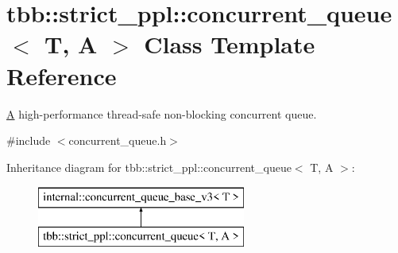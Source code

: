 \hypertarget{classtbb_1_1strict__ppl_1_1concurrent__queue}{}\section{tbb\+:\+:strict\+\_\+ppl\+:\+:concurrent\+\_\+queue$<$ T, A $>$ Class Template Reference}
\label{classtbb_1_1strict__ppl_1_1concurrent__queue}


\hyperlink{structA}{A} high-\/performance thread-\/safe non-\/blocking concurrent queue.  




{\ttfamily \#include $<$concurrent\+\_\+queue.\+h$>$}

Inheritance diagram for tbb\+:\+:strict\+\_\+ppl\+:\+:concurrent\+\_\+queue$<$ T, A $>$\+:\begin{figure}[H]
\begin{center}
\leavevmode
\includegraphics[height=2.000000cm]{classtbb_1_1strict__ppl_1_1concurrent__queue}
\end{center}
\end{figure}
